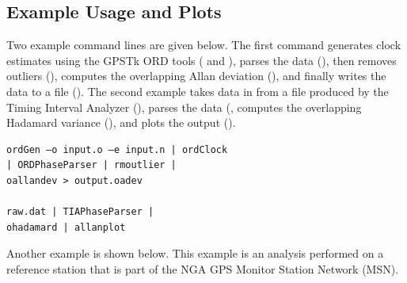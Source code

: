 \subsection*{Example Usage and Plots}

Two example command lines are given below.  The first command
generates clock estimates using the GPSTk ORD tools ( and
), parses the data (), then removes outliers
(), computes the overlapping Allan deviation (), and
finally writes the data to a file ().  The second example
takes data in from a file produced by the Timing Interval Analyzer
(), parses the data (, computes the overlapping
Hadamard variance (), and plots the output ().
%
\begin{scriptsize}
\begin{lstlisting}
ordGen –o input.o –e input.n | ordClock 
| ORDPhaseParser | rmoutlier | 
oallandev > output.oadev

raw.dat | TIAPhaseParser | 
ohadamard | allanplot
\end{lstlisting}
\end{scriptsize}
%
Another example is shown below.  This example is an analysis performed on a reference station that is part of the NGA GPS Monitor Station Network (MSN).

